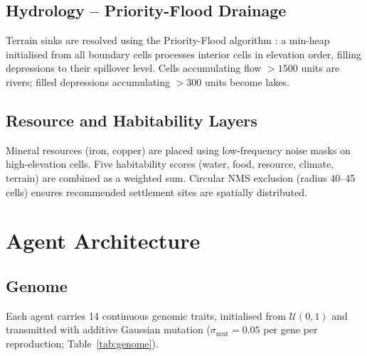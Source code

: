 \documentclass[12pt,a4paper]{article}
\begin{document}
\subsection{Hydrology -- Priority-Flood Drainage}

Terrain sinks are resolved using the Priority-Flood algorithm \cite{barnes2014}: a min-heap initialised from all boundary cells processes interior cells in elevation order, filling depressions to their spillover level. Cells accumulating flow $> 1500$ units are rivers; filled depressions accumulating $> 300$ units become lakes.

\subsection{Resource and Habitability Layers}

Mineral resources (iron, copper) are placed using low-frequency noise masks on high-elevation cells. Five habitability scores (water, food, resource, climate, terrain) are combined as a weighted sum. Circular NMS exclusion (radius 40--45 cells) ensures recommended settlement sites are spatially distributed.

\section{Agent Architecture}

\subsection{Genome}

Each agent carries 14 continuous genomic traits, initialised from $\mathcal{U}(0,1)$ and transmitted with additive Gaussian mutation ($\sigma_{\text{mut}} = 0.05$ per gene per reproduction; Table~\ref{tab:genome}).
\end{document}
